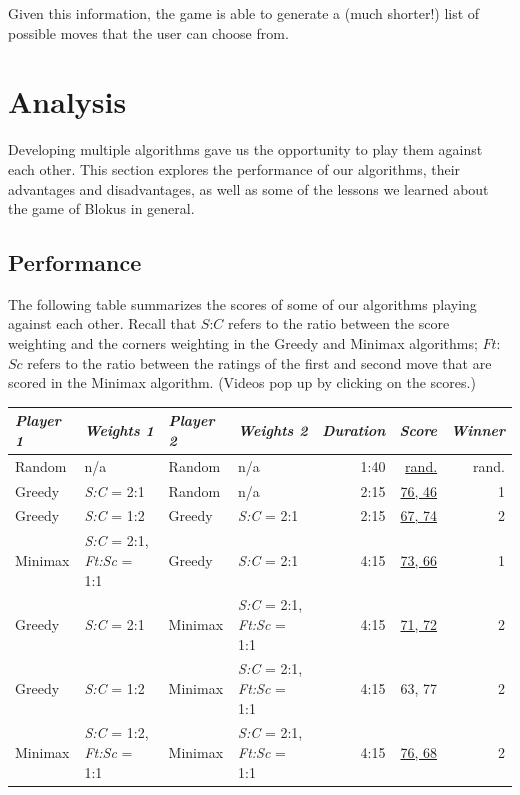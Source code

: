 \documentclass[11pt]{article}
\begin{document}
\noindent Given this information, the game is able to generate a (much shorter!) list of possible moves that the user can choose from.


\pagebreak


\section{Analysis}

Developing multiple algorithms gave us the opportunity to play them against each other. This section explores the performance of our algorithms, their advantages and disadvantages, as well as some of the lessons we learned about the game of Blokus in general.

\subsection{Performance}

The following table summarizes the scores of some of our algorithms playing against each other. Recall that $S$:$C$ refers to the ratio between the score weighting and the corners weighting in the Greedy and Minimax algorithms; $Ft$:$Sc$ refers to the ratio between the ratings of the first and second move that are scored in the Minimax algorithm. (Videos pop up by clicking on the scores.)

\bigskip
\begin{center}
\begin{tabular}{|l|l|l|l||r|r|r|}
\hline
{\it Player 1} & {\it Weights 1 } & {\it Player 2} & {\it Weights 2} & {\it Duration} & {\it Score} & {\it Winner} \\
\hline
Random & n/a & Random & n/a & 1:40 & \href{run:report/Videos/Random_v_Random.avi}{rand.} & rand. \\
\hline
Greedy & {\it S:C} = 2:1 & Random & n/a & 2:15 & \href{run:report/Videos/Greedy21_v_Random.avi}{76, 46} & 1 \\
\hline
Greedy & {\it S:C} = 1:2 & Greedy & {\it S:C} = 2:1 & 2:15 & \href{run:report/Videos/Greedy12_v_Greedy21.avi}{67, 74} & 2 \\
\hline
Minimax & {\it S:C} = 2:1, {\it Ft:Sc} = 1:1 & Greedy & {\it S:C} = 2:1 & 4:15 & \href{run:report/Videos/Minimax21511_v_Greedy21.avi}{73, 66} & 1 \\
\hline
Greedy & {\it S:C} = 2:1 & Minimax & {\it S:C} = 2:1, {\it Ft:Sc} = 1:1& 4:15 & \href{run:report/Videos/Greedy21_v_Minimax21511.avi}{71, 72} & 2 \\
\hline
Greedy & {\it S:C} = 1:2 & Minimax & {\it S:C} = 2:1, {\it Ft:Sc} = 1:1 & 4:15 & 63, 77 & 2 \\
\hline
Minimax & {\it S:C} = 1:2, {\it Ft:Sc} = 1:1 & Minimax & {\it S:C} = 2:1, {\it Ft:Sc} = 1:1 & 4:15 & \href{run:report/Videos/Minimax12511_v_Minimax21511}{76, 68} & 2 \\
\hline
\end{tabular}
\end{center}
\bigskip
\end{document}
